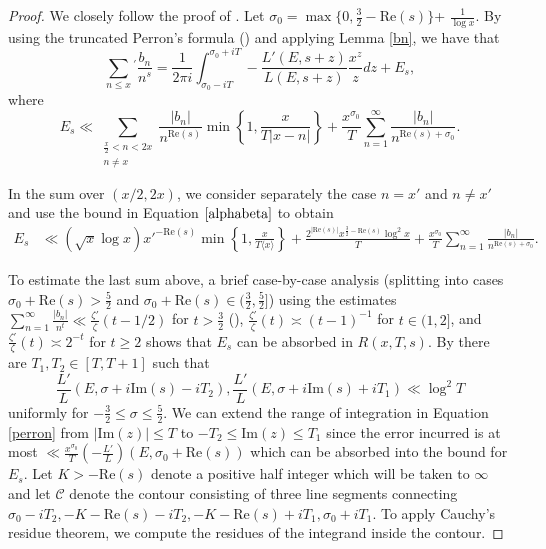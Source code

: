 \documentclass[12pt,reqno]{amsart}
\theoremstyle{definition}
\numberwithin{equation}{section}
\renewcommand{\Im}{\mathrm{Im}}
\renewcommand{\Re}{\mathrm{Re}}
\begin{document}
\begin{proof}
We closely follow the proof of \cite[Lemma 5.2]{Gor23}. Let $\sigma_0= \max  \{ 0, \frac{3}{2}-\Re(s) \}$+ $\frac{1}{\log x}$. By using the truncated Perron's formula (\cite[Corollary 5.3]{MV07}) and applying Lemma \ref{bn}, we have that 
\begin{equation} \label{perron}
\sum_{n \leq x} {}^{'} \frac{b_n}{n^s} = %
 \frac{1}{2 \pi i} \int_{\sigma_0- i T}^{\sigma_0+ i T}  - \frac{L'(E, s+z)}{L(E, s+z)} \frac{x^z}{z} dz + E_s, 
\end{equation}
where 
$$
E_s \ll \sum_{\substack{\frac{x}{2} < n < 2x \\ n \neq x}} \frac{ |b_n| }{n^{\Re(s)} } \min \left \{ 1, \frac{x}{T |x-n| } \right \} + \frac{x^ {\sigma_0}}{T} \sum_{n=1}^{\infty} \frac{ |b_n| }{n^{\Re(s)+\sigma_0}}. 
$$

In the sum over $(x/2, 2x)$, we consider separately the case $n=x'$ and $ n \neq x'$ and use the bound in Equation $\eqref{alphabeta}$ to obtain 
\begin{align*}
E_s 
& \ll (\sqrt x \log x ) x'^{-\Re(s)} \min \left \{ 1 , \frac{x}{T \langle x \rangle } \right \} + \frac{2^{|\Re(s)|} x^{\frac{3}{2}-\Re(s)} \log^2 x }{T} +  \frac{x^ {\sigma_0}}{T} \sum_{n=1}^{\infty} \frac{ |b_n| }{n^{\Re(s)+\sigma_0}}. 
\end{align*}

To estimate the last sum above,  a brief case-by-case analysis (splitting into cases $\sigma_0+\Re(s) > \frac{5}{2}$ and $\sigma_0+\Re(s) \in (\frac{3}{2}, \frac{5}{2}]$) using the estimates $\sum_{n=1}^{\infty} \frac{|b_n|}{n^t} \ll \frac{\zeta'}{\zeta}(t-1/2)$ for $t > \frac{3}{2}$ (\cite[Lemma 5.1.7]{Spicer2015}), $\frac{\zeta'}{\zeta}(t) \asymp (t-1)^{-1}$ for $t \in (1, 2]$, and  $\frac{\zeta'}{\zeta}(t) \asymp 2^{-t}$ for $t \geq 2$ shows that $E_s$ can be absorbed in  $R(x, T, s)$. By \cite[Lemma 2.2 (i)]{Qu2007} there are $T_1, T_2 \in [T, T+1]$ such that 
\begin{equation} \label{qu}
\frac{L'}{L}(E, \sigma+ i \Im(s)- iT_2), \frac{L'}{L}(E, \sigma+ i \Im(s)+iT_1) \ll \log^2 T
\end{equation}
uniformly for $-\frac{3}{2} \leq  \sigma \leq \frac{5}{2}$.  We can extend the range of integration in Equation \eqref{perron} from $|\Im(z)| \leq T$ to $-T_2 \leq \Im(z) \leq T_1$ since the error incurred is at most $ \ll \frac{x^{\sigma_0}}{T} \left( -\frac{L'}{L} \right)(E, \sigma_0+ \Re(s)) $ which can be absorbed into the bound for $E_s$. Let $K > -\Re(s)$ denote a positive half integer which will be taken to $\infty$ and let $\mathcal C$ denote the contour consisting of three line segments connecting $\sigma_0-iT_2, -K-\Re(s)-iT_2, -K-\Re(s)+iT_1, \sigma_0+iT_1$. 
To apply Cauchy's residue theorem,  we compute the residues of the integrand inside the contour.   



\end{proof}
\end{document}
